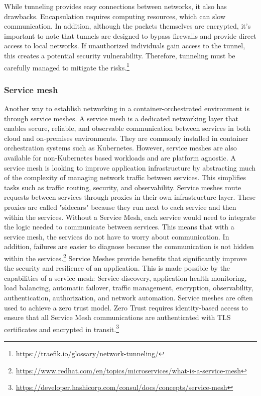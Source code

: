%
While tunneling provides easy connections between networks, it also has drawbacks. Encapsulation requires computing resources, which can slow communication. In addition, although the packets themselves are encrypted, it's important to note that tunnels are designed to bypass firewalls and provide direct access to local networks. If unauthorized individuals gain access to the tunnel, this creates a potential security vulnerability. Therefore, tunneling must be carefully managed to mitigate the risks.\footnote{\url{https://traefik.io/glossary/network-tunneling/}}
%
\subsubsection{Service mesh}
Another way to establish networking in a container-orchestrated environment is through service meshes. A service mesh is a dedicated networking layer that enables secure, reliable, and observable communication between services in both cloud and on-premises environments. They are commonly installed in container orchestration systems such as Kubernetes. However, service meshes are also available for non-Kubernetes based workloads and are platform agnostic. A service mesh is looking to improve application infrastructure by abstracting much of the complexity of managing network traffic between services. This simplifies tasks such as traffic routing, security, and observability.
Service meshes route requests between services through proxies in their own infrastructure layer. These proxies are called "sidecars" because they run next to each service and then within the services. Without a Service Mesh, each service would need to integrate the logic needed to communicate between services. This means that with a service mesh, the services do not have to worry about communication. In addition, failures are easier to diagnose because the communication is not hidden within the services.\footnote{\url{https://www.redhat.com/en/topics/microservices/what-is-a-service-mesh}}
Service Meshes provide benefits that significantly improve the security and resilience of an application. This is made possible by the capabilities of a service mesh: Service discovery, application health monitoring, load balancing, automatic failover, traffic management, encryption, observability, authentication, authorization, and network automation. Service meshes are often used to achieve a zero trust model. Zero Trust requires identity-based access to ensure that all Service Mesh communications are authenticated with TLS certificates and encrypted in transit.\footnote{\url{https://developer.hashicorp.com/consul/docs/concepts/service-mesh}}

